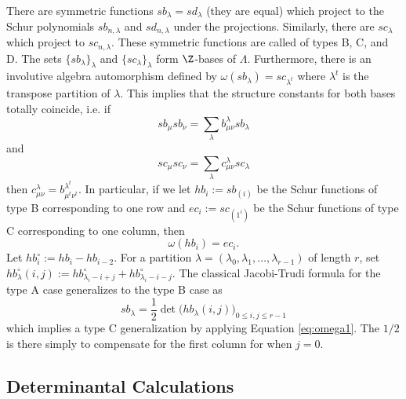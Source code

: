There are symmetric functions $sb_\lambda=sd_\lambda$ (they are equal) which project to the Schur polynomials $sb_{n,\lambda}$ and $sd_{n, \lambda}$ under the projections. Similarly, there are $sc_\lambda$ which project to $sc_{n, \lambda}$. These symmetric functions are called  of types B, C, and D. The sets $\{sb_\lambda \}_\lambda$ and $\{sc_\lambda \}_\lambda$ form $\Z$-bases of $\Lambda$. Furthermore, there is an involutive algebra automorphism defined by $\omega(sb_\lambda) = sc_{\lambda^t}$ where $\lambda^t$ is the transpose partition of $\lambda$. This implies that the structure constants for both bases totally coincide, i.e. if 
\[
sb_{\mu} sb_{\nu} = \sum_\lambda b_{\mu \nu}^\lambda sb_\lambda
\]
and
\[
sc_{\mu} sc_{\nu} = \sum_\lambda c_{\mu \nu}^{\lambda} sc_{\lambda}
\]
then $c_{\mu \nu}^\lambda = b_{\mu^t \nu^t}^{\lambda^t}$. In particular, if we let $hb_i := sb_{(i)}$ be the Schur functions of type B corresponding to one row and $ec_i := sc_{(1^i)}$ be the Schur functions of type C corresponding to one column, then 
\begin{equation} \label{eq:omega1}
\omega(hb_i) = ec_i.
\end{equation}
Let $hb_i^\circ := hb_i - hb_{i-2}$. For a partition $\lambda=(\lambda_0, \lambda_1, \dots, \lambda_{r-1})$ of length $r$, set $hb_\lambda^\circ(i,j) := hb_{\lambda_i - i + j}^\circ + hb_{\lambda_i - i - j}^\circ$. The classical Jacobi-Trudi formula for the type A case generalizes to the type B case as
\begin{equation} \label{eq:jacobitrudi}
sb_\lambda = \frac{1}{2} \det \big( hb_\lambda(i, j) \big)_{0 \leq i, j \leq r-1}
\end{equation}
which implies a type C generalization by applying Equation \eqref{eq:omega1}. The $1/2$ is there simply to compensate for the first column for when $j=0$. 


\subsection{Determinantal Calculations}

